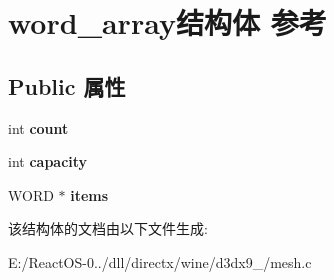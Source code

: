 \hypertarget{structword__array}{}\section{word\+\_\+array结构体 参考}
\label{structword__array}
\subsection*{Public 属性}
\begin{DoxyCompactItemize}
\item 
\mbox{\label{structword__array_a9f91b2f9af7d5c692a23338d0cd33acf}} 
int {\bfseries count}
\item 
\mbox{\label{structword__array_a0f8e07ed38eb15163fae681fb2a0f744}} 
int {\bfseries capacity}
\item 
\mbox{\label{structword__array_a5539d62caadc31fb59a0d8d8c2c928d7}} 
W\+O\+RD $\ast$ {\bfseries items}
\end{DoxyCompactItemize}


该结构体的文档由以下文件生成\+:\begin{DoxyCompactItemize}
\item 
E\+:/\+React\+O\+S-\/0../dll/directx/wine/d3dx9\+\_/mesh.\+c\end{DoxyCompactItemize}
